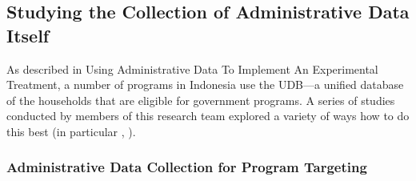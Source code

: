 \documentclass[
]{WileySix}
\begin{document}
\hypertarget{studying-the-collection-of-administrative-data-itself}{%
\subsection{Studying the Collection of Administrative Data Itself}\label{studying-the-collection-of-administrative-data-itself}}

As described in Using Administrative Data To Implement An Experimental Treatment, a number of programs in Indonesia use the UDB---a unified database of the households that are eligible for government programs. A series of studies conducted by members of this research team explored a variety of ways how to do this best (in particular \citet{alatas2012}, \citet{alatas2016}).

\hypertarget{administrative-data-collection-for-program-targeting}{%
\subsubsection{Administrative Data Collection for Program Targeting}\label{administrative-data-collection-for-program-targeting}}
\end{document}
